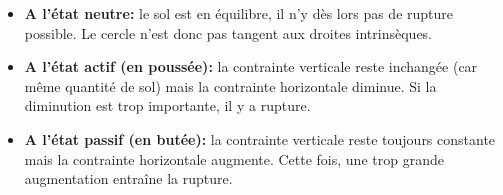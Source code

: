         \begin{itemize}
            \item \textbf{A l'état neutre:} le sol est en équilibre, il n'y dès lors pas de rupture possible. Le cercle n'est donc pas tangent aux droites intrinsèques.
            \item \textbf{A l'état actif (en poussée):} la contrainte verticale reste inchangée (car même quantité de sol) mais la contrainte horizontale diminue. Si la diminution est trop importante, il y a rupture.
            \item \textbf{A l'état passif (en butée):} la contrainte verticale reste toujours constante mais la contrainte horizontale augmente. Cette fois, une trop grande augmentation entraîne la rupture.
        \end{itemize}
        
